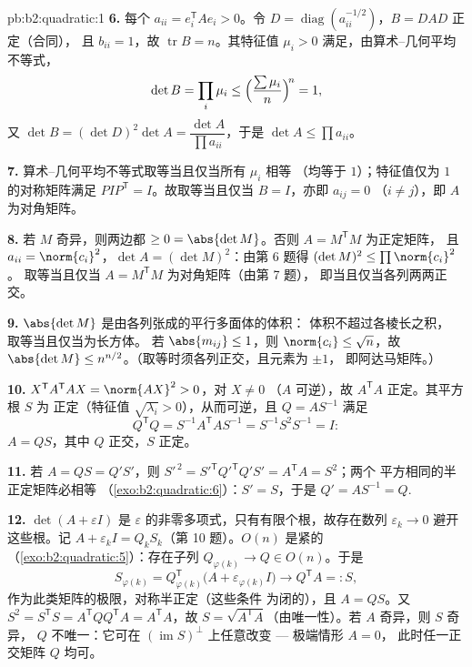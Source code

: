 \begin{solution}{pb:b2:quadratic:1}
\textbf{6.} 每个 $a_{ii} = e_i^{\mathsf T}Ae_i > 0$。令 $D =
\operatorname{diag}(a_{ii}^{-1/2})$，$B = DAD$ 正定（合同），
且 $b_{ii} = 1$，故 $\operatorname{tr}
B = n$。其特征值 $\mu_i > 0$ 满足，由算术–几何平均不等式，
\[
\det B = \prod_i\mu_i
\leq \Bigl(\frac{\sum\mu_i}{n}\Bigr)^{\!n} = 1 ,
\]
又 $\det B = (\det D)^2\det A = \dfrac{\det A}{\prod
a_{ii}}$，于是 $\det A \leq \prod a_{ii}$。

\textbf{7.} 算术–几何平均不等式取等当且仅当所有 $\mu_i$ 相等
（均等于 $1$）；特征值仅为 $1$ 的对称矩阵满足
$PIP^{\mathsf T} = I$。故取等当且仅当 $B = I$，亦即 $a_{ij} = 0$
（$i \neq j$），即 $A$ 为对角矩阵。

\textbf{8.} 若 $M$ 奇异，则两边都 $\geq 0 =
\abs{\det M}$。否则 $A = M^{\mathsf T}M$ 为正定矩阵，
且 $a_{ii} = \norm{c_i}^2$，$\det A = (\det
M)^2$：由第 6 题得 $(\det M)^2 \leq \prod\norm{c_i}^2$。
取等当且仅当 $A = M^{\mathsf T}M$ 为对角矩阵（由第 7 题），
即当且仅当各列两两正交。

\textbf{9.} $\abs{\det M}$ 是由各列张成的平行多面体的体积：
体积不超过各棱长之积，
取等当且仅当为长方体。
若 $\abs{m_{ij}} \leq 1$，则 $\norm{c_i} \leq \sqrt n$，故
$\abs{\det M} \leq n^{n/2}$。（取等时须各列正交，且元素为 $\pm1$，
即阿达马矩阵。）

\textbf{10.} $X^{\mathsf T}A^{\mathsf T}AX = \norm{AX}^2 > 0$，对 $X \neq 0$
（$A$ 可逆），故 $A^{\mathsf T}A$ 正定。其平方根 $S$ 为
正定（特征值
$\sqrt{\lambda_i} > 0$），从而可逆，且 $Q = AS^{-1}$
满足
\[
Q^{\mathsf T}Q = S^{-1}A^{\mathsf T}AS^{-1}
= S^{-1}S^2S^{-1} = I :
\]
$A = QS$，其中 $Q$ 正交，$S$ 正定。

\textbf{11.} 若 $A = QS = Q'S'$，则 $S'^{\,2} =
S'^{\mathsf T}Q'^{\mathsf T}Q'S' = A^{\mathsf T}A = S^2$；两个
平方相同的半正定矩阵必相等
（\cref{exo:b2:quadratic:6}）：$S' = S$，于是 $Q' = AS^{-1} =
Q$.

\textbf{12.} $\det(A + \varepsilon I)$ 是
$\varepsilon$ 的非零多项式，只有有限个根，故存在数列
$\varepsilon_k \to 0$ 避开这些根。记 $A + \varepsilon_kI =
Q_kS_k$（第 10 题）。$O(n)$ 是紧的
（\cref{exo:b2:quadratic:5}）：存在子列 $Q_{\varphi(k)}
\to Q \in O(n)$。于是
\[
S_{\varphi(k)} = Q_{\varphi(k)}^{\mathsf T}
\bigl(A + \varepsilon_{\varphi(k)}I\bigr)
\longrightarrow Q^{\mathsf T}A =: S,
\]
作为此类矩阵的极限，对称半正定（这些条件
为闭的），且 $A = QS$。又 $S^2 = S^{\mathsf T}S =
A^{\mathsf T}QQ^{\mathsf T}A = A^{\mathsf T}A$，故 $S =
\sqrt{A^{\mathsf T}A}$（由唯一性）。若 $A$ 奇异，则 $S$ 奇异，
$Q$ 不唯一：它可在 $(\operatorname{im} S)^{\perp}$ 上任意改变 ---
极端情形 $A = 0$，
此时任一正交矩阵 $Q$ 均可。


\end{solution}
